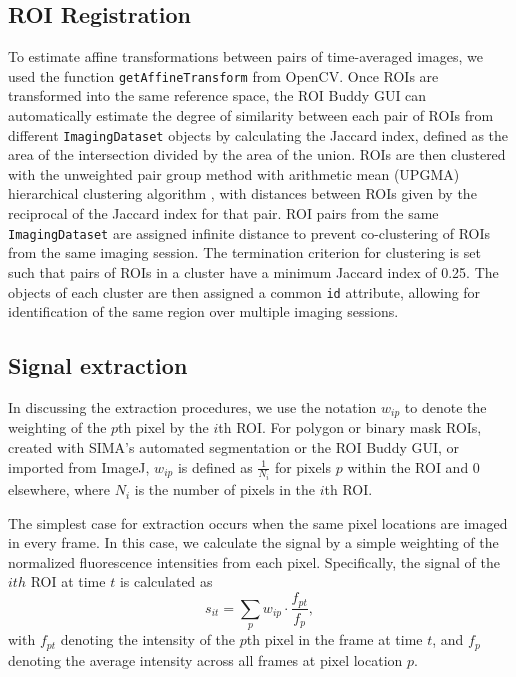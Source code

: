 \subsection{ROI Registration}
To estimate affine transformations between pairs of time-averaged images, we used the function
\verb|getAffineTransform| from OpenCV.
Once ROIs are transformed into the same reference space, the ROI Buddy GUI can automatically estimate
the degree of similarity between each pair of ROIs from different \verb|ImagingDataset| objects by calculating the Jaccard index,
defined as the area of the intersection divided by the area of the union.
ROIs are then clustered with the unweighted pair group method with arithmetic mean (UPGMA) hierarchical
clustering algorithm \citep{Sokal1958}, with distances between ROIs given by the reciprocal of the Jaccard index for that pair.
ROI pairs from the same \verb|ImagingDataset| are assigned infinite distance to prevent co-clustering of ROIs from the same imaging session. 
The termination criterion for clustering is set such that pairs of ROIs in a cluster have a minimum Jaccard index of 0.25.
The objects of each cluster are then assigned a common \verb|id| attribute, allowing for identification
of the same region over multiple imaging sessions.


\subsection{Signal extraction}
\label{sec:sima:details:extraction}
In discussing the extraction procedures, 
we use the notation $w_{ip}$ to denote the weighting of the $p$th pixel by the $i$th ROI.
For polygon or binary mask ROIs, 
created with SIMA's automated segmentation or the ROI Buddy GUI, or imported from ImageJ,
$w_{ip}$ is defined as $\frac{1}{N_i}$ for pixels $p$ within the ROI and 0 elsewhere, where $N_i$ is the
number of pixels in the $i$th ROI.

The simplest case for extraction occurs when the same pixel locations are imaged in every frame.
In this case, we calculate the signal by a simple weighting of the normalized fluorescence intensities
from each pixel.
Specifically, the signal of the $ith$ ROI at time $t$ is calculated as
\begin{equation}\label{eq:extraction-basic}
    s_{it} = \sum_p w_{ip}\cdot \frac{f_{pt}}{f_p},
\end{equation}
with $f_{pt}$ denoting the intensity of the $p$th pixel in the frame at time $t$,
and $f_p$ denoting the average intensity across all frames at pixel location $p$.

